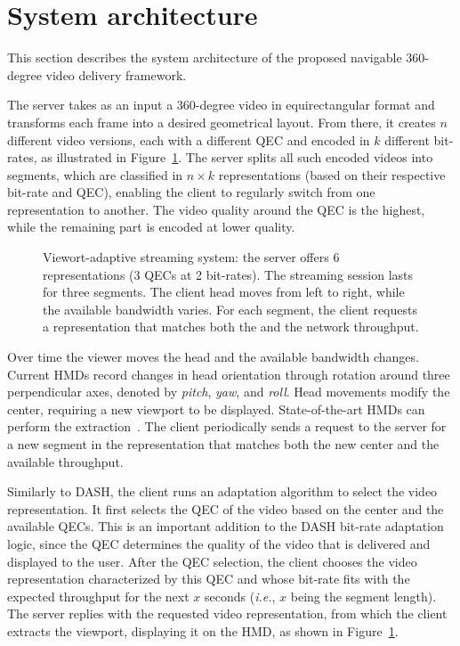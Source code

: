 \section{System architecture}


This section describes the system architecture of the proposed
navigable $360$-degree video delivery framework.

The server takes as an input a $360$-degree video in
equirectangular format and transforms each frame into a desired
geometrical layout. From there, it creates $n$ different video
versions, each with a different \ac{QEC} and encoded in $k$ different
bit-rates, as illustrated in Figure~\ref{fig:newdelivery}. The server
splits all such encoded videos into segments, which are classified in
$n\!\times\!k$ representations (based on their respective bit-rate and
\ac{QEC}), enabling the client to regularly switch from one
representation to another. The video quality around the
\ac{QEC} is the highest, while the remaining part is encoded at lower
quality.

\begin{figure}
   \centering
   
   \caption{Viewort-adaptive streaming system: the server offers \num{6} representations (\num{3} \acp{QEC} at \num{2} bit-rates). The streaming session lasts for three segments. The client head moves from left to right, while the available bandwidth varies. For each segment, the client requests a representation that matches both the \FoV{} and the network throughput.}
   \label{fig:newdelivery}
\end{figure}

Over time the viewer moves the head and the
available bandwidth changes. Current \acp{HMD} record changes
in head orientation through rotation around three perpendicular axes,
denoted by \emph{pitch}, \emph{yaw}, and \emph{roll}.
Head movements modify the \FoV{} center, requiring a new viewport
to be displayed. State-of-the-art \acp{HMD} can perform the
extraction~\cite{fovhmds}. The client periodically sends a request
to the server for a new segment in the representation that
matches both the new \FoV{} center and the available throughput.

Similarly to \ac{DASH}, the client runs
an adaptation algorithm to select the video representation. It first
selects the \ac{QEC} of the video based on the \FoV{} center and
the available \acp{QEC}. This is an important addition to
the \ac{DASH} bit-rate adaptation logic, since the \ac{QEC} determines
the quality of the video that is delivered and displayed to the user.
After the \ac{QEC} selection, the client chooses the video
representation characterized by this \ac{QEC} and whose bit-rate fits
with the expected throughput for the next $x$ seconds (\textit{i.e.},
$x$ being the segment length). The server replies
with the requested video representation, from which the
client extracts the viewport, displaying it on the \ac{HMD}, as
shown in Figure~\ref{fig:newdelivery}.

